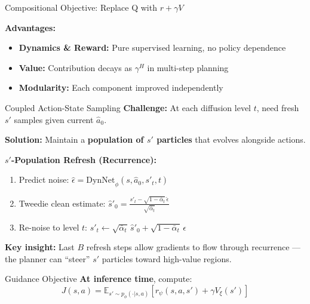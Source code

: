 \documentclass[final,hyperref={pdfpagelabels=false}]{beamer}
\newlength{\colwidth}
\begin{document}
\begin{frame}[t]
\begin{columns}[t]
\begin{column}{\colwidth}
\begin{block}{\Large Compositional Objective: Replace Q with $r + \gamma V$}
\begin{center}
\begin{tikzpicture}[scale=1.2, every node/.style={scale=1.2},
    block/.style={rectangle, draw, rounded corners, minimum height=3em, minimum width=3em, text centered, align=center, line width=1.5pt}]
\end{tikzpicture}
\end{center}

\vspace{0.5em}
\textbf{Advantages:}
\begin{itemize}
    \item \textbf{Dynamics \& Reward:} Pure supervised learning, no policy dependence
    \item \textbf{Value:} Contribution decays as $\gamma^H$ in multi-step planning
    \item \textbf{Modularity:} Each component improved independently
\end{itemize}
\end{block}

\vspace{1cm}

\begin{block}{\Large Coupled Action-State Sampling}
\textbf{Challenge:} At each diffusion level $t$, need fresh $s'$ samples given current $\hat{a}_0$.

\vspace{0.5em}
\textbf{Solution:} Maintain a \textbf{population of $s'$ particles} that evolves alongside actions.

\vspace{0.5em}
\textbf{$s'$-Population Refresh (Recurrence):}
\begin{enumerate}
    \item Predict noise: $\hat{\epsilon} = \text{DynNet}_\phi(s, \hat{a}_0, s'_t, t)$
    \item Tweedie clean estimate: $\hat{s}'_0 = \frac{s'_t - \sqrt{1-\bar{\alpha}_t}\,\hat{\epsilon}}{\sqrt{\bar{\alpha}_t}}$
    \item Re-noise to level $t$: $s'_t \gets \sqrt{\bar{\alpha}_t}\,\hat{s}'_0 + \sqrt{1-\bar{\alpha}_t}\,\epsilon$
\end{enumerate}

\vspace{0.5em}
\textbf{Key insight:} Last $B$ refresh steps allow gradients to flow through recurrence --- the planner can ``steer'' $s'$ particles toward high-value regions.
\end{block}

\vspace{1cm}

\begin{block}{\Large Guidance Objective}
\textbf{At inference time}, compute:
\[
J(s, a) = \mathbb{E}_{s' \sim p_\phi(\cdot|s,a)}\left[ r_\psi(s, a, s') + \gamma V_\xi(s') \right]
\]


\end{block}
\end{column}
\end{columns}
\end{frame}
\end{document}
